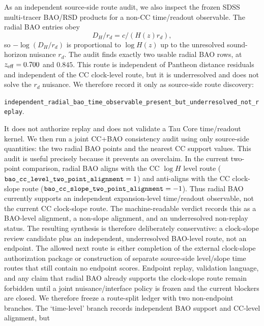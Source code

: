 \documentclass[11pt]{article}
\begin{document}
As an independent source-side route audit, we also inspect the frozen SDSS
multi-tracer BAO/RSD products for a non-CC time/readout observable.  The radial
BAO entries obey
\[
  D_H/r_d = c/(H(z)r_d),
\]
so \(-\log(D_H/r_d)\) is proportional to \(\log H(z)\) up to the unresolved
sound-horizon nuisance \(r_d\).  The audit finds exactly two usable radial BAO
rows, at \(z_{\rm eff}=0.700\) and \(0.845\).  This route is independent of
Pantheon distance residuals and independent of the CC clock-level route, but it
is underresolved and does not solve the \(r_d\) nuisance.  We therefore record
it only as source-side route discovery:
\begin{center}\texttt{independent\_\allowbreak{}radial\_\allowbreak{}bao\_\allowbreak{}time\_\allowbreak{}observable\_\allowbreak{}present\_\allowbreak{}but\_\allowbreak{}underresolved\_\allowbreak{}not\_\allowbreak{}replay}.\end{center}
It does not authorize replay and does not validate a Tau Core time/readout
kernel.
We then run a joint CC+BAO consistency audit using only source-side quantities:
the two radial BAO points and the nearest CC support values.  This audit is
useful precisely because it prevents an overclaim.  In the current two-point
comparison, radial BAO aligns with the CC \(\log H\) level route
(\(\texttt{bao\_\allowbreak{}cc\_\allowbreak{}level\_\allowbreak{}two\_\allowbreak{}point\_\allowbreak{}alignment}=1\)) and anti-aligns with the
CC clock-slope route
(\(\texttt{bao\_\allowbreak{}cc\_\allowbreak{}slope\_\allowbreak{}two\_\allowbreak{}point\_\allowbreak{}alignment}=-1\)).  Thus radial BAO
currently supports an independent expansion-level time/readout observable, not
the current CC clock-slope route.  The machine-readable verdict records this
as a BAO-level alignment, a non-slope alignment, and an underresolved non-replay
status.  The resulting synthesis is therefore deliberately conservative: a
clock-slope review candidate plus an independent, underresolved BAO-level
route, not an endpoint.
The allowed next route is either completion of the external clock-slope
authorization package or construction of separate source-side level/slope time
routes that still contain no endpoint scores.  Endpoint replay, validation
language, and any claim that radial BAO already supports the clock-slope route
remain forbidden until a joint nuisance/interface policy is frozen and the
current blockers are closed.
We therefore freeze a route-split ledger with two non-endpoint branches.  The
`time-level' branch records independent BAO support and CC-level alignment, but
\end{document}
